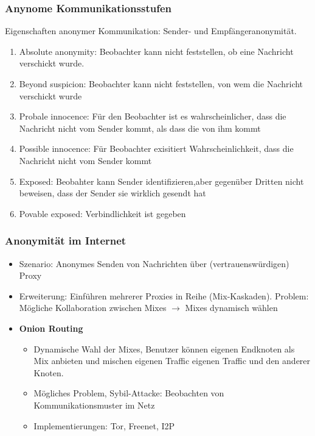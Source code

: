 \subsubsection{Anynome Kommunikationsstufen}
Eigenschaften anonymer Kommunikation: Sender- und Empfängeranonymität.
\begin{enumerate}
	\item Absolute anonymity: Beobachter kann nicht feststellen, ob eine Nachricht verschickt wurde.
	\item Beyond suspicion: Beobachter kann nicht feststellen, von wem die Nachricht verschickt wurde
	\item Probale innocence: Für den Beobachter ist es wahrscheinlicher, dass die Nachricht nicht vom Sender kommt, als dass die von ihm kommt
	\item Possible innocence: Für Beobachter exisitiert Wahrscheinlichkeit, dass die Nachricht nicht vom Sender kommt
	\item Exposed: Beobahter kann Sender identifizieren,aber gegenüber Dritten nicht beweisen, dass der Sender sie wirklich gesendt hat
	\item Povable exposed: Verbindlichkeit ist gegeben
\end{enumerate}

\subsubsection{Anonymität im Internet}
\begin{itemize}
	\item Szenario: Anonymes Senden von Nachrichten über (vertrauenswürdigen) Proxy
	\item Erweiterung: Einführen mehrerer Proxies in Reihe (Mix-Kaskaden). Problem: Mögliche Kollaboration zwischen Mixes $\rightarrow$ Mixes dynamisch wählen
	\item \textbf{Onion Routing}
	\begin{itemize}
		\item Dynamische Wahl der Mixes, Benutzer können eigenen Endknoten als Mix anbieten und mischen eigenen Traffic eigenen Traffic und den anderer Knoten.
		\item Mögliches Problem, Sybil-Attacke: Beobachten von Kommunikationsmuster im Netz
		\item Implementierungen: Tor, Freenet, I2P
	\end{itemize}
\end{itemize}



